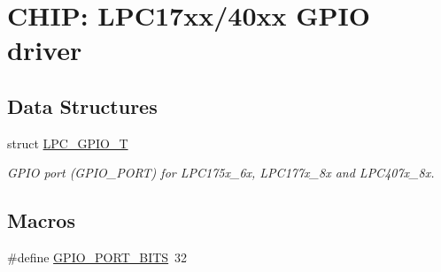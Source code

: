 \hypertarget{group__GPIO__17XX__40XX}{\section{C\-H\-I\-P\-: L\-P\-C17xx/40xx G\-P\-I\-O driver}
\label{group__GPIO__17XX__40XX}
}
\subsection*{Data Structures}
\begin{DoxyCompactItemize}
\item 
struct \hyperlink{structLPC__GPIO__T}{L\-P\-C\-\_\-\-G\-P\-I\-O\-\_\-\-T}
\begin{DoxyCompactList}\small\item\em G\-P\-I\-O port (G\-P\-I\-O\-\_\-\-P\-O\-R\-T) for L\-P\-C175x\-\_\-6x, L\-P\-C177x\-\_\-8x and L\-P\-C407x\-\_\-8x. \end{DoxyCompactList}\end{DoxyCompactItemize}
\subsection*{Macros}
\begin{DoxyCompactItemize}
\item 
\#define \hyperlink{group__GPIO__17XX__40XX_gab4525a5821aedad3e12d4fcdfb760c69}{G\-P\-I\-O\-\_\-\-P\-O\-R\-T\-\_\-\-B\-I\-T\-S}~32
\end{DoxyCompactItemize}
